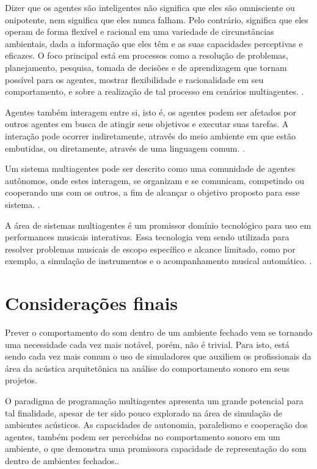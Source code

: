 Dizer que os agentes são inteligentes não significa que eles são omnisciente ou onipotente, nem significa que eles nunca falham. Pelo contrário, significa que eles operam de forma flexível e racional em uma variedade de circunstâncias ambientais, dada a informação que eles têm e as suas capacidades perceptivas e eficazes. O foco principal está em processos como a resolução de problemas, planejamento, pesquisa, tomada de decisões e de aprendizagem que tornam possível para os agentes, mostrar flexibilidade e racionalidade em seu comportamento, e sobre a realização de tal processo em cenários multiagentes. \cite{multiagentes2}.

Agentes também interagem entre si, isto é, os agentes podem ser afetados por outros agentes em busca de atingir seus objetivos e executar suas tarefas. A interação pode ocorrer indiretamente, através do meio ambiente em que estão embutidas, ou diretamente, através de uma linguagem comum. \cite{multiagentes2}.

Um sistema multiagentes pode ser descrito como uma comunidade de agentes autônomos, onde estes interagem, se organizam e se comunicam, competindo ou cooperando uns com os outros, a fim de alcançar o objetivo proposto para esse sistema. \cite{thomaz}.

A área de sistemas multiagentes é um promissor domínio tecnológico para uso em performances musicais interativas. Essa tecnologia vem sendo utilizada para resolver problemas musicais de escopo específico e alcance limitado, como por exemplo, a simulação de instrumentos e o acompanhamento musical automático. \cite{thomaz}.

\section{Considerações finais}

Prever o comportamento do som dentro de um ambiente fechado vem se tornando uma necessidade cada vez mais notável, porém, não é trivial. Para isto, está sendo cada vez mais comum o uso de simuladores que auxiliem os profissionais da área da acústica arquitetônica na análise do comportamento sonoro em seus projetos.

O paradigma de programação multiagentes apresenta um grande potencial para tal finalidade, apesar de ter sido pouco explorado na área de simulação de ambientes acústicos. As capacidades de autonomia, paralelismo e cooperação dos agentes, também podem ser percebidas no comportamento sonoro em um ambiente, o que demonstra uma promissora capacidade de representação do som dentro de ambientes fechados..